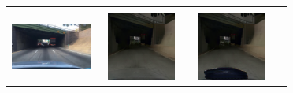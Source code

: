 \documentclass{VUMIFPSbakalaurinis}
\begin{document}
\begin{table}[H]
{\begin{tabular}{|c|c|c|c|}
            \hline
            \\
            \includegraphics[width=100,height=85]{img/original/7d24a7cd-daeaf356} & 
            \includegraphics[width=100,height=85]{img/mspcv2/7d24a7cd-daeaf356} & 
            \includegraphics[width=100,height=85]{img/mspccar/7d24a7cd-daeaf356} \\
            \hline
            \end{tabular}
        }
        \label{tab:table example}
    \end{table}
\end{document}
